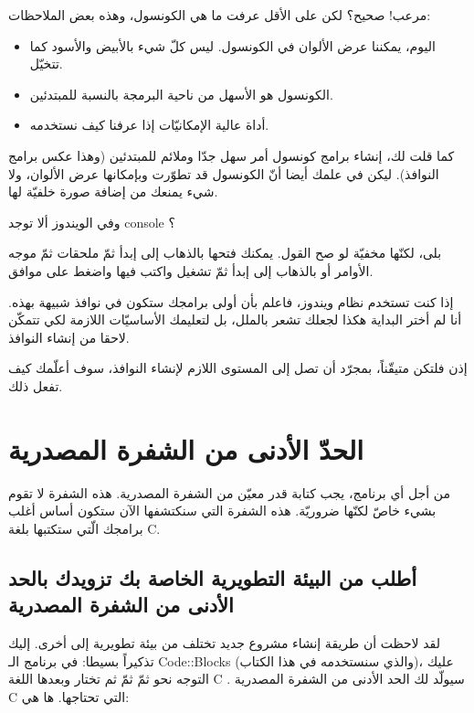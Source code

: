 
مرعب! صحيح؟ لكن على الأقل عرفت ما هي الكونسول، وهذه بعض الملاحظات:
\begin{itemize}
  \item اليوم، يمكننا عرض الألوان في الكونسول. ليس كلّ شيء بالأبيض والأسود كما تتخيّل.
  \item الكونسول هو الأسهل من ناحية البرمجة بالنسبة للمبتدئين.
  \item أداة عالية الإمكانيّات إذا عرفنا كيف نستخدمه.
\end{itemize}

كما قلت لك، إنشاء برامج كونسول أمر سهل جدّا وملائم للمبتدئين (وهذا عكس برامج النوافذ). ليكن في علمك أيضا أنّ الكونسول قد تطوّرت وبإمكانها عرض الألوان، ولا شيء يمنعك من إضافة صورة خلفيّة لها.

\begin{question}
  وفي الويندوز ألا توجد
\textenglish{console}
 ؟
\end{question}

بلى، لكنّها مخفيّة لو صح القول. يمكنك فتحها بالذهاب إلى إبدأ
 ثمّ ملحقات
 ثمّ موجه الأوامر
 أو بالذهاب إلى إبدأ ثمّ تشغيل
 واكتب فيها
 واضغط على موافق.


إذا كنت تستخدم نظام ويندوز، فاعلم بأن أولى برامجك ستكون في نوافذ شبيهة بهذه. أنا لم أختر البداية هكذا لجعلك تشعر بالملل، بل لتعليمك الأساسيّات اللازمة لكي تتمكّن لاحقا من إنشاء النوافذ.

إذن فلتكن متيقّناً، بمجرّد أن تصل إلى المستوى اللازم لإنشاء النوافذ، سوف أعلّمك كيف تفعل ذلك.

\section{الحدّ الأدنى من الشفرة المصدرية}
من أجل أي برنامج، يجب كتابة قدر معيّن من الشفرة المصدرية. هذه الشفرة لا تقوم بشيء خاصّ لكنّها ضروريّة. هذه الشفرة التي سنكتشفها الآن ستكون أساس أغلب برامجك الّتي ستكتبها بلغة \textenglish{C}.

\subsection{أطلب من البيئة التطويرية الخاصة بك تزويدك بالحد الأدنى من الشفرة المصدرية}
لقد لاحظت أن طريقة إنشاء مشروع جديد تختلف من بيئة تطويرية إلى أخرى. إليك تذكيراً بسيطا: في برنامج الـ
\textenglish{Code::Blocks}
 (والذي سنستخدمه في هذا الكتاب)، عليك التوجه نحو
 ثمّ
 ثمّ
 ثم تختار
 وبعدها اللغة
\textenglish{C}
. سيولّد لك الحد الأدنى من الشفرة المصدرية
 \textenglish{C}
 التي تحتاجها. ها هي:

